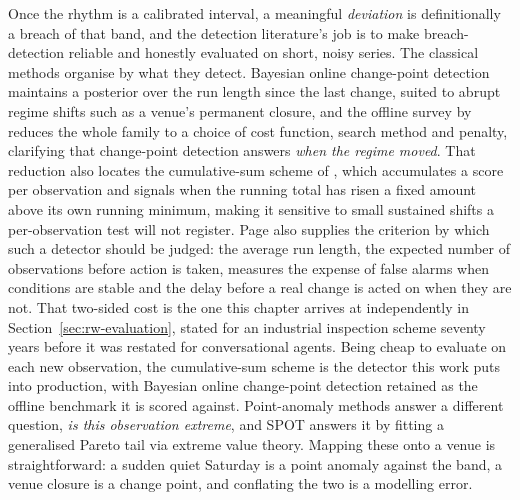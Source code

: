 Once the rhythm is a calibrated interval, a meaningful \emph{deviation} is
definitionally a breach of that band, and the detection literature's job is to
make breach-detection reliable and honestly evaluated on short, noisy series. The
classical methods organise by what they detect. Bayesian online change-point
detection \citep{adams_bayesian_2007} maintains a posterior over the run length
since the last change, suited to abrupt regime shifts such as a venue's permanent
closure, and the offline survey by \citet{truong_selective_2020} reduces the
whole family to a choice of cost function, search method and penalty, clarifying
that change-point detection answers \emph{when the regime moved}. That reduction
also locates the cumulative-sum scheme of \citet{page_continuous_1954}, which
accumulates a score per observation and signals when the running total has risen
a fixed amount above its own running minimum, making it sensitive to small
sustained shifts a per-observation test will not register. Page also supplies the
criterion by which such a detector should be judged: the average run length, the
expected number of observations before action is taken, measures the expense of
false alarms when conditions are stable and the delay before a real change is
acted on when they are not. That two-sided cost is the one this chapter arrives
at independently in Section~\ref{sec:rw-evaluation}, stated for an industrial
inspection scheme seventy years before it was restated for conversational agents.
Being cheap to evaluate on each new observation, the cumulative-sum scheme is the
detector this work puts into production, with Bayesian online change-point
detection retained as the offline benchmark it is scored against. Point-anomaly
methods answer a different question, \emph{is this observation extreme}, and SPOT
\citep{siffer_anomaly_2017} answers it by fitting a generalised Pareto tail via
extreme value theory. Mapping these onto a venue is straightforward: a sudden
quiet Saturday is a point anomaly against the band, a venue closure is a change
point, and conflating the two is a modelling error.

